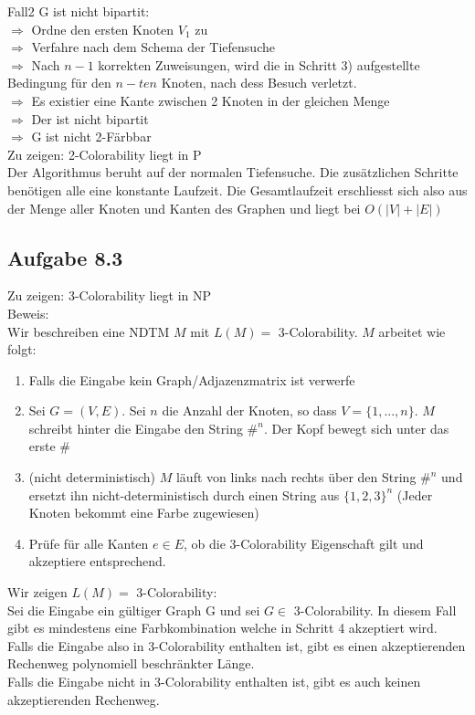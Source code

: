 Fall2 G ist nicht bipartit:\\
$\Rightarrow$ Ordne den ersten Knoten $V_1$ zu\\
$\Rightarrow$ Verfahre nach dem Schema der Tiefensuche\\
$\Rightarrow$ Nach $n-1$ korrekten Zuweisungen, wird die in Schritt 3) aufgestellte\\
Bedingung für den $n-ten$ Knoten, nach dess Besuch verletzt.\\
$\Rightarrow$ Es existier eine Kante zwischen 2 Knoten in der gleichen Menge\\
$\Rightarrow$ Der ist nicht bipartit\\
$\Rightarrow$ G ist nicht 2-Färbbar\\

Zu zeigen: 2-Colorability liegt in P\\
Der Algorithmus beruht auf der normalen Tiefensuche. Die zusätzlichen Schritte benötigen alle
eine konstante Laufzeit. Die Gesamtlaufzeit erschliesst sich also aus der Menge aller Knoten
und Kanten des Graphen und liegt bei $O(|V| + |E|)$

\subsection*{Aufgabe 8.3}

Zu zeigen: 3-Colorability liegt in NP\\

Beweis:\\
Wir beschreiben eine NDTM $M$ mit $L(M)=$ 3-Colorability. $M$ arbeitet wie folgt:\\
\begin{enumerate}
\item Falls die Eingabe kein Graph/Adjazenzmatrix ist verwerfe
\item Sei $G=(V,E)$. Sei $n$ die Anzahl der Knoten, so dass $V = \{1,...,n\}$. 
$M$ schreibt hinter die Eingabe den String $\#^{n}$. Der Kopf bewegt sich unter das erste $\#$
\item (nicht deterministisch) $M$ läuft von links nach rechts über den String $\#^{n}$ und 
ersetzt ihn nicht-deterministisch durch einen String aus $\{1, 2, 3\}^{n}$
(Jeder Knoten bekommt eine Farbe zugewiesen)
\item Prüfe für alle Kanten $e \in E$, ob die 3-Colorability Eigenschaft gilt und 
akzeptiere entsprechend.
\end{enumerate}

Wir zeigen $L(M)=$ 3-Colorability:\\
Sei die Eingabe ein gültiger Graph G und sei $G \in $ 3-Colorability.
In diesem Fall gibt es mindestens eine Farbkombination welche in Schritt 4 akzeptiert wird.\\
Falls die Eingabe also in 3-Colorability enthalten ist, gibt es einen akzeptierenden
Rechenweg polynomiell beschränkter Länge.\\
Falls die Eingabe nicht in 3-Colorability enthalten ist, gibt es auch keinen
akzeptierenden Rechenweg.\\

